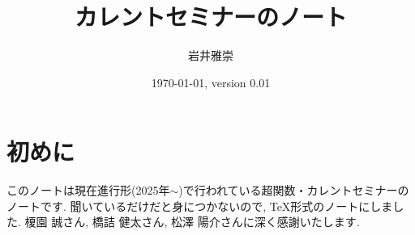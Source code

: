 \documentclass[dvipdfmx,a4paper,11pt]{report} %
\title{カレントセミナーのノート}
\author{岩井雅崇}
\date{\today, version 0.01}
\theoremstyle{definition}
\theoremstyle{remark}
\numberwithin{equation}{section}
\begin{document}
\maketitle
\tableofcontents %

\chapter*{初めに}
このノートは現在進行形(2025年$\sim$)で行われている超関数・カレントセミナーのノートです.
聞いているだけだと身につかないので, TeX形式のノートにしました. 
榎園 誠さん, 橋詰 健太さん, 松澤 陽介さんに深く感謝いたします. 



 
 

%
\end{document}
